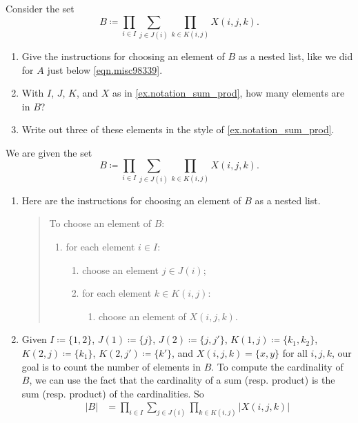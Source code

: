 \documentclass[Book-Poly]{subfiles}
\begin{document}
\begin{exercise}
Consider the set
\[B \coloneqq \prod_{i\in I}\sum_{j\in J(i)}\prod_{k\in K(i,j)}X(i,j,k).\]
\begin{enumerate}
	\item Give the instructions for choosing an element of $B$ as a nested list, like we did for $A$ just below \eqref{eqn.misc98339}.
	\item With $I$, $J$, $K$, and $X$ as in \cref{ex.notation_sum_prod}, how many elements are in $B$?
	\item Write out three of these elements in the style of \cref{ex.notation_sum_prod}.
\qedhere
\end{enumerate}
\begin{solution}
We are given the set
\[
    B \coloneqq \prod_{i\in I}\sum_{j\in J(i)}\prod_{k\in K(i,j)}X(i,j,k).
\]
\begin{enumerate}
	\item Here are the instructions for choosing an element of $B$ as a nested list.
	\begin{quote}
	    To choose an element of $B$:
	    \begin{enumerate}[label=\arabic*.]
	        \item for each element $i \in I$:
	        \begin{enumerate}[label=\arabic*.]
	            \item choose an element $j \in J(i)$;
	            \item for each element $k \in K(i, j)$:
	            \begin{enumerate}[label=\arabic*.]
	                \item choose an element of $X(i,j,k)$.
	            \end{enumerate}
	        \end{enumerate}
	    \end{enumerate}
	\end{quote}
	\item Given $I\coloneqq\{1,2\}$, $J(1)\coloneqq\{j\}$, $J(2)\coloneqq\{j,j'\}$, $K(1,j)\coloneqq\{k_1,k_2\}$, $K(2,j)\coloneqq\{k_1\}$, $K(2,j')\coloneqq\{k'\}$, and $X(i,j,k)=\{x,y\}$ for all $i,j,k$, our goal is to count the number of elements in $B$.
	To compute the cardinality of $B$, we can use the fact that the cardinality of a sum (resp. product) is the sum (resp. product) of the cardinalities.
	So
	\begin{align*}
	    |B| &= \prod_{i\in I}\sum_{j\in J(i)}\prod_{k\in K(i,j)}|X(i,j,k)| \\

\end{align*}
\end{enumerate}
\end{solution}
\end{exercise}
\end{document}
